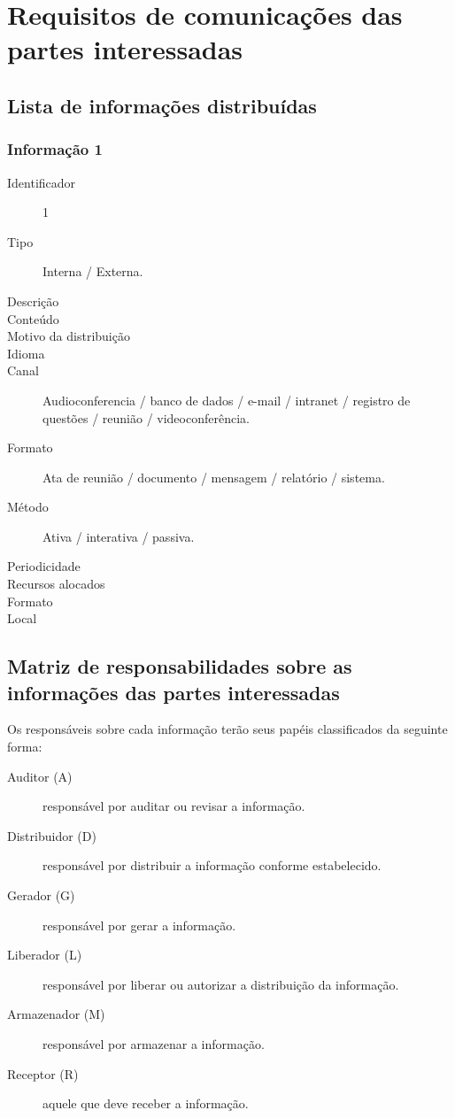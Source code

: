 \chapter{Requisitos de comunicações das partes interessadas}
\label{ch:stakeholder-communication-requirements}

\section{Lista de informações distribuídas}

\subsection{Informação 1}

\begin{description}
\item[Identificador] 1
\item[Tipo] Interna / Externa.
\item[Descrição]
\item[Conteúdo]
\item[Motivo da distribuição]
\item[Idioma]
\item[Canal] Audioconferencia / banco de dados / e-mail / intranet / registro de questões / reunião / videoconferência.
\item[Formato] Ata de reunião / documento / mensagem / relatório / sistema.
\item[Método] Ativa / interativa / passiva.
\item[Periodicidade] 
\item[Recursos alocados]
\item[Formato]
\item[Local]
\end{description}

\section{Matriz de responsabilidades sobre as informações das partes interessadas}

Os responsáveis sobre cada informação terão seus papéis classificados da seguinte forma:

\begin{description}
\item[Auditor (A)] responsável por auditar ou revisar a informação.
\item[Distribuidor (D)] responsável por distribuir a informação conforme estabelecido.
\item[Gerador (G)] responsável por gerar a informação.
\item[Liberador (L)] responsável por liberar ou autorizar a distribuição da informação.
\item[Armazenador (M)] responsável por armazenar a informação.
\item[Receptor (R)] aquele que deve receber a informação.
\end{description}

